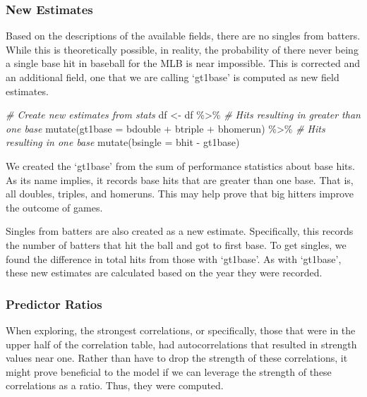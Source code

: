 \documentclass[
]{article}
\newenvironment{Shaded}{\begin{snugshade}}{\end{snugshade}}
\newcommand{\AttributeTok}[1]{\textcolor[rgb]{0.77,0.63,0.00}{#1}}
\newcommand{\CommentTok}[1]{\textcolor[rgb]{0.56,0.35,0.01}{\textit{#1}}}
\newcommand{\FunctionTok}[1]{\textcolor[rgb]{0.00,0.00,0.00}{#1}}
\newcommand{\NormalTok}[1]{#1}
\newcommand{\OtherTok}[1]{\textcolor[rgb]{0.56,0.35,0.01}{#1}}
\newcommand{\SpecialCharTok}[1]{\textcolor[rgb]{0.00,0.00,0.00}{#1}}
\begin{document}
\hypertarget{new-estimates}{%
\subsubsection{New Estimates}\label{new-estimates}}

Based on the descriptions of the available fields, there are no singles
from batters. While this is theoretically possible, in reality, the
probability of there never being a single base hit in baseball for the
MLB is near impossible. This is corrected and an additional field, one
that we are calling `gt1base' is computed as new field estimates.

\begin{Shaded}
\begin{Highlighting}[]
\CommentTok{\# Create new estimates from stats}
\NormalTok{df }\OtherTok{\textless{}{-}}\NormalTok{ df }\SpecialCharTok{\%\textgreater{}\%} 
  \CommentTok{\# Hits resulting in greater than one base }
  \FunctionTok{mutate}\NormalTok{(}\AttributeTok{gt1base =}\NormalTok{ bdouble }\SpecialCharTok{+}\NormalTok{ btriple }\SpecialCharTok{+}\NormalTok{ bhomerun) }\SpecialCharTok{\%\textgreater{}\%} 
  \CommentTok{\# Hits resulting in one base}
  \FunctionTok{mutate}\NormalTok{(}\AttributeTok{bsingle =}\NormalTok{ bhit }\SpecialCharTok{{-}}\NormalTok{ gt1base)}
\end{Highlighting}
\end{Shaded}

We created the `gt1base' from the sum of performance statistics about
base hits. As its name implies, it records base hits that are greater
than one base. That is, all doubles, triples, and homeruns. This may
help prove that big hitters improve the outcome of games.

Singles from batters are also created as a new estimate. Specifically,
this records the number of batters that hit the ball and got to first
base. To get singles, we found the difference in total hits from those
with `gt1base'. As with `gt1base', these new estimates are calculated
based on the year they were recorded.

\hypertarget{predictor-ratios}{%
\subsubsection{Predictor Ratios}\label{predictor-ratios}}

When exploring, the strongest correlations, or specifically, those that
were in the upper half of the correlation table, had autocorrelations
that resulted in strength values near one. Rather than have to drop the
strength of these correlations, it might prove beneficial to the model
if we can leverage the strength of these correlations as a ratio. Thus,
they were computed.
\end{document}
